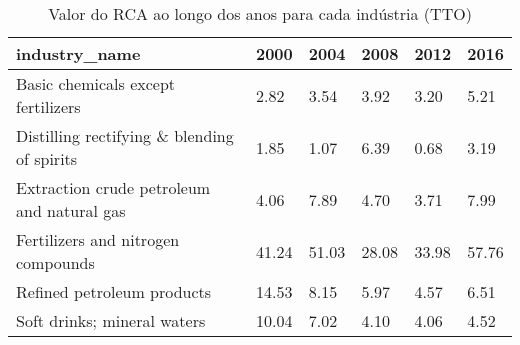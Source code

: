 \begin{table}
\centering
\caption{Valor do RCA ao longo dos anos para cada indústria (TTO)}
\begin{tabular}{p{6cm}p{1.5cm}p{1.5cm}p{1.5cm}p{1.5cm}p{1.5cm}}
\toprule
                              industry\_name &  2000 &  2004 &  2008 &  2012 &  2016 \\
\midrule
         Basic chemicals except fertilizers &  2.82 &  3.54 &  3.92 &  3.20 &  5.21 \\
Distilling rectifying \& blending of spirits &  1.85 &  1.07 &  6.39 &  0.68 &  3.19 \\
 Extraction crude petroleum and natural gas &  4.06 &  7.89 &  4.70 &  3.71 &  7.99 \\
         Fertilizers and nitrogen compounds & 41.24 & 51.03 & 28.08 & 33.98 & 57.76 \\
                 Refined petroleum products & 14.53 &  8.15 &  5.97 &  4.57 &  6.51 \\
                Soft drinks; mineral waters & 10.04 &  7.02 &  4.10 &  4.06 &  4.52 \\
\bottomrule
\end{tabular}
\end{table}
